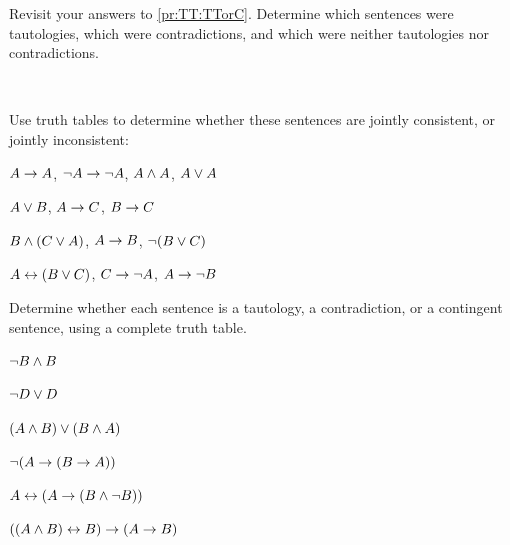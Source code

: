 \begin{practiceproblems}
	\problempart
	Revisit your answers to \cref{pr:TT:TTorC}. Determine which sentences were tautologies, which were contradictions, and which were neither tautologies nor contradictions.
	\solutions
	
	\
	
	\problempart
	\label{pr:TT:consistent}
	Use truth tables to determine whether these sentences are jointly consistent, or jointly inconsistent:
	\begin{problemslist}
		\item $A\rightarrow A$, $\neg A \rightarrow \neg A$, $A\mathbin{\wedge} A$, $A\vee A$ %
		\item $A\vee B$, $A\rightarrow C$, $B\rightarrow C$ %
		\item $B\mathbin{\wedge}(C\vee A)$, $A\rightarrow B$, $\neg(B\vee C)$  %
		\item $A\leftrightarrow(B\vee C)$, $C\rightarrow \neg A$, $A\rightarrow \neg B$ %
	\end{problemslist}
	
	
	
	\problempart Determine whether each sentence is a tautology, a contradiction, or a contingent sentence, using a complete truth table.
	\begin{problemslist}
		\item $\neg B \mathbin{\wedge} B$ \vspace{.5ex}%
		
		
		\item $\neg D \vee D$ \vspace{.5ex}%
		
		
		\item $(A\mathbin{\wedge} B) \vee (B\mathbin{\wedge} A)$\vspace{.5ex} %
		
		
		\item $\neg(A \rightarrow (B \rightarrow A))$\vspace{.5ex} %
		
		
		\item $A \leftrightarrow (A \rightarrow (B \mathbin{\wedge} \neg B))$ \vspace{.5ex}%
		
		
		\item $((A \mathbin{\wedge} B) \leftrightarrow B) \rightarrow (A \rightarrow B)$ \vspace{.5ex}%
		
	\end{problemslist}
	
	
	

\end{practiceproblems}
